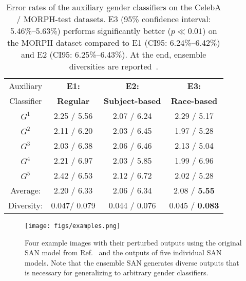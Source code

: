 \documentclass[10pt,twocolumn,letterpaper]{article}
\begin{document}
\begin{table}
\caption{Error rates of the auxiliary gender classifiers on the CelebA / MORPH-test datasets. E3 (95\% confidence interval: 5.46\%--5.63\%) performs significantly better ($p \ll 0.01$) on the MORPH dataset compared to E1 (CI95: 6.24\%--6.42\%) and E2 (CI95: 6.25\%--6.43\%). At the end, ensemble diversities are reported~\cite{kuncheva_combining_2004}.}
\label{tab:ensemble-aux-classifiers}
\begin{center}
\begin{threeparttable}
\small
\begin{tabular}{cccc}
 \toprule{\small Auxiliary} & {\bf E1:}& {\bf E2:}& {\bf E3:}\\{\small  Classifier} &{\bf \small Regular} & {\bf \small Subject-based} & {\bf \small Race-based} \\ 
\midrule
$G^1$ & 2.25 / 5.56 & 2.07 / 6.24 & 2.29 / 5.17 \\ %
$G^2$ & 2.11 / 6.20 & 2.03 / 6.45 & 1.97 / 5.28 \\ %
$G^3$ & 2.03 / 6.38 & 2.06 / 6.46 & 2.13 / 5.04 \\ %
$G^4$ & 2.21 / 6.97 & 2.03 / 5.85 & 1.99 / 6.96 \\ %
$G^5$ & 2.42 / 6.53 & 2.12 / 6.72 & 2.02 / 5.28 \\ %
\midrule
Average: &  2.20 / 6.33 & 2.06 / 6.34 & 2.08 / \textbf{5.55} \\ 
Diversity: & 0.047/ 0.079 & 0.044 / 0.076 & 0.045 / {\bf 0.083} \\ \bottomrule
\end{tabular}%
\end{threeparttable}
\end{center}
\end{table}


\begin{figure*}
\begin{center}
   \texttt{[image: figs/examples.png]}
\end{center}
   \caption{Four example images with their perturbed outputs using the original SAN model from Ref.~\cite{mirjalili_semi_2018} 
  and the outputs of five individual SAN models. Note that the ensemble SAN generates diverse outputs that is necessary for generalizing to arbitrary gender classifiers. }
\label{fig:example-orig-ensans}
\end{figure*}

\label{sec:unseen-gender-classifiers}
\end{document}
